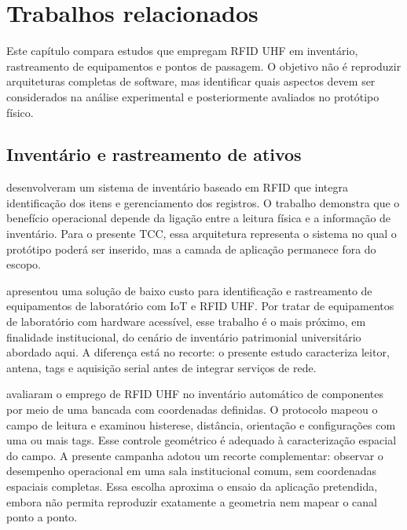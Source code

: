 %
%

\chapter{Trabalhos relacionados}
\label{cap:trabalhos-relacionados}

Este capítulo compara estudos que empregam RFID UHF em inventário, rastreamento de equipamentos e pontos de passagem. O objetivo não é reproduzir arquiteturas completas de software, mas identificar quais aspectos devem ser considerados na análise experimental e posteriormente avaliados no protótipo físico.

\section{Inventário e rastreamento de ativos}

 desenvolveram um sistema de inventário baseado em RFID que integra identificação dos itens e gerenciamento dos registros. O trabalho demonstra que o benefício operacional depende da ligação entre a leitura física e a informação de inventário. Para o presente TCC, essa arquitetura representa o sistema no qual o protótipo poderá ser inserido, mas a camada de aplicação permanece fora do escopo.

 apresentou uma solução de baixo custo para identificação e rastreamento de equipamentos de laboratório com IoT e RFID UHF. Por tratar de equipamentos de laboratório com hardware acessível, esse trabalho é o mais próximo, em finalidade institucional, do cenário de inventário patrimonial universitário abordado aqui. A diferença está no recorte: o presente estudo caracteriza leitor, antena, tags e aquisição serial antes de integrar serviços de rede.

 avaliaram o emprego de RFID UHF no inventário automático de componentes por meio de uma bancada com coordenadas definidas. O protocolo mapeou o campo de leitura e examinou histerese, distância, orientação e configurações com uma ou mais tags. Esse controle geométrico é adequado à caracterização espacial do campo. A presente campanha adotou um recorte complementar: observar o desempenho operacional em uma sala institucional comum, sem coordenadas espaciais completas. Essa escolha aproxima o ensaio da aplicação pretendida, embora não permita reproduzir exatamente a geometria nem mapear o canal ponto a ponto.

